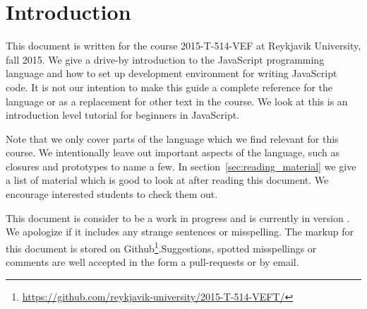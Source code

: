 \section{Introduction}\label{sec:introduction}
This document is written for the course 2015-T-514-VEF at Reykjavik University, fall 2015. We give a drive-by introduction to the JavaScript programming language and how to set up development environment for writing JavaScript code. It is not our intention to make this guide a complete reference for the language or as a replacement for other text in the course. We look at this is an introduction level tutorial for beginners in JavaScript.

Note that we only cover parts of the language which we find relevant for this course. We intentionally leave out important aspects of the language, such as closures and prototypes to name a few. In section~\ref{sec:reading_material} we give a list of material which is good to look at after reading this document. We encourage interested students to check them out.

This document is consider to be a work in progress and is currently in version \currentVersion. We apologize if it includes any strange sentences or misspelling. The markup for this document is stored on Github\footnote{\url{https://github.com/reykjavik-university/2015-T-514-VEFT/}}.Suggestions, spotted misspellings or comments are well accepted in the form a pull-requests or by email.

